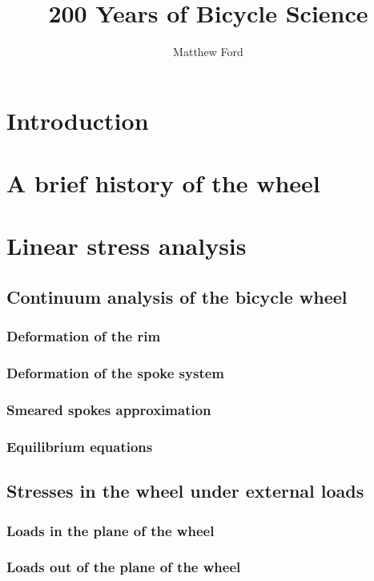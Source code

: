 \documentclass[12pt,letterpaper]{report}
\begin{document}
\title{200 Years of Bicycle Science}
\author{Matthew Ford}

\maketitle


\tableofcontents


\chapter{Introduction}



\chapter{A brief history of the wheel}


\chapter{Linear stress analysis}
\section{Continuum analysis of the bicycle wheel}
\subsection{Deformation of the rim}
\subsection{Deformation of the spoke system}
\subsection{Smeared spokes approximation}
\subsection{Equilibrium equations}
\section{Stresses in the wheel under external loads}
\subsection{Loads in the plane of the wheel}
\subsection{Loads out of the plane of the wheel}
\end{document}
